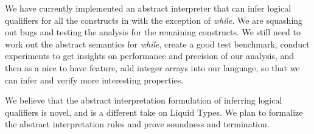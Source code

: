 We have currently implemented an abstract interpreter that can infer logical qualifiers for all the constructs in \lang with the exception of \textit{while}. 
We are squashing out bugs and testing the analysis for the remaining constructs. 
We still need to work out the abstract semantics for \textit{while}, create a good test benchmark, conduct experiments to get insights on performance and precision of our analysis, and then as a nice to have feature, add integer arrays into our language, so that we can infer and verify more interesting properties.

We believe that the abstract interpretation formulation of inferring logical qualifiers is novel, and is a different take on Liquid Types\cite{Rondon2008}. 
We plan to formalize the abstract interpretation rules and prove soundness and termination. 


